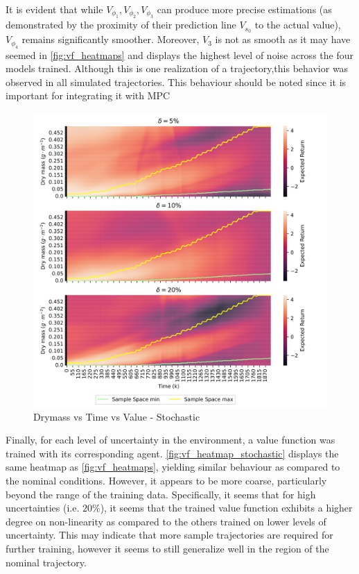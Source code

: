 \begin{remark}\label{rem:vf-smoothness}
	It is evident that while $V_{\phi_1}, V_{\phi_2}, V_{\phi_3}$ can produce more precise estimations (as demonstrated by the proximity of their prediction line $V_{s_0}$ to the actual value), $V_{\phi_4}$ remains significantly smoother. Moreover, $V_3$ is not as smooth as it may have seemed in \autoref{fig:vf_heatmaps} and displays the highest level of noise across the four models trained. Although this is one realization of a trajectory,this behavior was observed in all simulated trajectories. This behaviour should be noted since it is important for integrating it with MPC
\end{remark}



\begin{figure}[H]
	\centering
	\includegraphics[width = \textwidth]{figures/vf_heatmap_stochastic-eps-converted-to.png}
	\caption{Drymass vs Time vs Value - Stochastic}
	\label{fig:vf_heatmap_stochastic}
\end{figure}
Finally, for each level of uncertainty in the environment, a value function was trained with its corresponding agent. \autoref{fig:vf_heatmap_stochastic} displays the same heatmap as \autoref{fig:vf_heatmaps}, yielding similar behaviour as compared to the nominal conditions. However, it appears to be more coarse, particularly beyond the range of the training data. Specifically, it seems that for high uncertainties (i.e. $20\%$), it seems that the trained value function exhibits a higher degree on non-linearity as compared to the others trained on lower levels of uncertainty. This may indicate that more sample trajectories are required for further training, however it seems to still generalize well in the region of the nominal trajectory.


